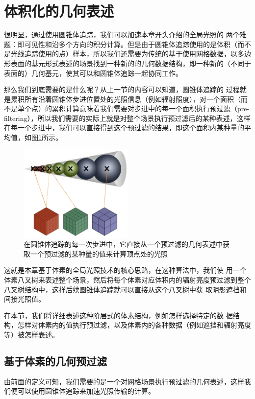 \section{体积化的几何表述}\label{sec:vct-volumetric-presentation}
很明显，通过使用圆锥体追踪，我们可以加速本章开头介绍的全局光照的 两个难题：即可见性和沿多个方向的积分计算。但是由于圆锥体追踪使用的是体积（而不是光线追踪使用的点）样本，所以我们还需要为传统的基于使用网格数据，以多边形表面的基元形式表述的场景找到一种新的的几何数据结构，即一种新的（不同于表面的）几何基元，使其可以和圆锥体追踪一起协同工作。

那么我们到底需要的是什么呢？从上一节的内容可以知道，圆锥体追踪的 过程就是累积所有沿着圆锥体步进位置处的光照信息（例如辐射照度），对一个面积（而不是单个点）的累积计算意味着我们需要对步进中的每一个面积执行预过滤（pre-filtering），所以我们需要的实际上就是对整个场景执行预过滤后的某种表述，这样在每一个步进中，我们可以直接得到这个预过滤的结果，即这个面积内某种量的平均值，如图\ref{f:vct-2-4}所示。

\begin{figure}
\sidecaption
	\includegraphics[width=0.5\textwidth]{figures/vct/vct-2-4}
	\caption{在圆锥体追踪的每一次步进中，它直接从一个预过滤的几何表述中获取一个预过滤的某种量的值来计算顶点处的光照}
	\label{f:vct-2-4}
\end{figure}

这就是本章基于体素的全局光照技术的核心思路，在这种算法中，我们使 用一个体素八叉树来表述整个场景，然后将每个体素对应体积内的辐射亮度预过滤到整个八叉树结构中，这样后续圆锥体追踪就可以直接从这个八叉树中获 取阴影遮挡和间接光照值。

在本节，我们将详细表述这种阶层式的体素结构，例如怎样选择特定的数 据结构，怎样对体素内的值执行预过滤，以及体素内的各种数据（例如遮挡和辐射亮度等）被怎样表述。



\subsection{基于体素的几何预过滤}
由前面的定义可知，我们需要的是一个对网格场景执行预过滤的几何表述，这样我们便可以使用圆锥体追踪来加速光照传输的计算。


